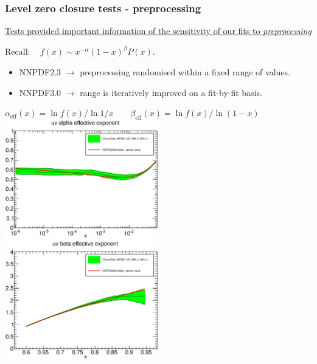 \documentclass[10pt]{beamer}
\begin{document}
\begin{frame}
\frametitle{Level zero closure tests - preprocessing}

\begin{center}
\underline{Tests provided important information of the sensitivity of our fits to \emph{preprocessing}}
\end{center}


$ \mathrm{Recall:} \quad f(x) \sim x^{-\alpha}(1-x)^{\beta} P(x).$

\begin{itemize}
\item NNPDF2.3 $\to$ preprocessing randomised within a fixed range of values.
\item NNPDF3.0 $\to$ range is iteratively improved on a fit-by-fit basis.

\end{itemize}

\begin{center}
$\alpha_{\mathrm{eff}}(x) = \ln f(x) / \ln 1/x \quad\quad \beta_{\mathrm{eff}}(x) = \ln f(x) / \ln (1-x)$
\vskip10pt
\includegraphics[width=0.5\textwidth]{figures/uv_preproc_CT_vs_MSTW_alpha.eps}
\includegraphics[width=0.5\textwidth]{figures/uv_preproc_CT_vs_MSTW_beta.eps}

\end{center}

\end{frame}
\end{document}
